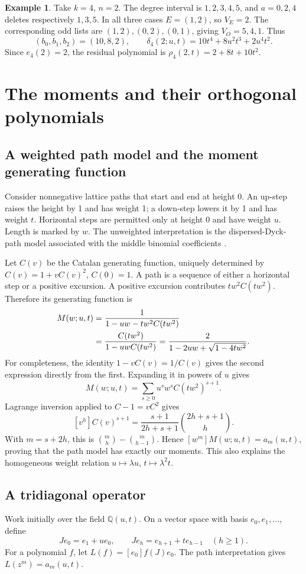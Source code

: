 \documentclass[11pt,letterpaper]{article}
\numberwithin{equation}{section}
\theoremstyle{definition}
\newtheorem{example}[theorem]{Example}
\newcommand{\Q}{\mathbb Q}
\begin{document}
\begin{example}\label{ex:k4n2}
Take \(k=4\), \(n=2\). The degree interval is \(1,2,3,4,5\), and
\(a=0,2,4\) deletes respectively \(1,3,5\). In all three cases
\(E=(1,2)\), so \(V_E=2\). The corresponding odd lists are
\((1,2),(0,2),(0,1)\), giving \(V_O=5,4,1\). Thus
\[
 (b_0,b_1,b_2)=(10,8,2),\qquad
 \delta_4(2;u,t)=10t^4+8u^2t^3+2u^4t^2.
\]
Since \(e_4(2)=2\), the residual polynomial is
\(\rho_4(2,t)=2+8t+10t^2\).
\end{example}

\section{The moments and their orthogonal polynomials}\label{sec:moments}
\subsection{A weighted path model and the moment generating function}
Consider nonnegative lattice paths that start and end at height 0.
An up-step raises the height by 1 and has weight 1; a down-step lowers it
by 1 and has weight \(t\). Horizontal steps are permitted only at height
0 and have weight \(u\). Length is marked by \(w\). The unweighted
interpretation is the dispersed-Dyck-path model associated with the middle
binomial coefficients \cite{Cigler2021,OEIS1405}.

Let \(C(v)\) be the Catalan generating function, uniquely determined by
\(C(v)=1+vC(v)^2\), \(C(0)=1\). A path is a sequence of either a
horizontal step or a positive excursion. A positive excursion contributes
\(tw^2C(tw^2)\). Therefore its generating function is
\begin{align}
 M(w;u,t)&=\frac{1}{1-uw-tw^2C(tw^2)}\notag\\
 &=\frac{C(tw^2)}{1-uwC(tw^2)}
 =\frac{2}{1-2uw+\sqrt{1-4tw^2}}.\label{eq:M}
\end{align}
For completeness, the identity \(1-vC(v)=1/C(v)\) gives the second
expression directly from the first. Expanding it in powers of \(u\)
gives
\[
 M(w;u,t)=\sum_{s\ge0}u^sw^s C(tw^2)^{s+1}.
\]
Lagrange inversion applied to \(C-1=vC^2\) gives
\[
 [v^h]C(v)^{s+1}
 =\frac{s+1}{2h+s+1}\binom{2h+s+1}{h}.
\]
With \(m=s+2h\), this is
\(\binom mh-\binom m{h-1}\). Hence
\([w^m]M(w;u,t)=a_m(u,t)\), proving that the path model has exactly
our moments. This also explains the homogeneous weight relation
\(u\mapsto\lambda u\), \(t\mapsto\lambda^2t\).

\subsection{A tridiagonal operator}
Work initially over the field \(\Q(u,t)\). On a vector space with basis
\(e_0,e_1,\ldots\), define
\[
 J e_0=e_1+u e_0,\qquad
 J e_h=e_{h+1}+t e_{h-1}\quad(h\ge1).
\]
For a polynomial \(f\), let
\(L(f)=[e_0]f(J)e_0\). The path interpretation gives
\(L(z^m)=a_m(u,t)\).
\end{document}

